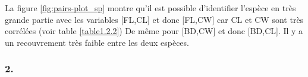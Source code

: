 \documentclass{article}
\begin{document}
La figure \ref{fig:pairs-plot_sp} montre qu'il est possible d'identifier l'espèce en très grande partie avec les variables [FL,CL] et donc [FL,CW] car CL et CW sont très corrélées (voir table \ref{table1.2.2}) De même pour [BD,CW] et donc [BD,CL]. Il y a un recouvrement très faible entre les deux espèces.



 







\subsubsection*{2.}\label{1.2.2}
\end{document}

